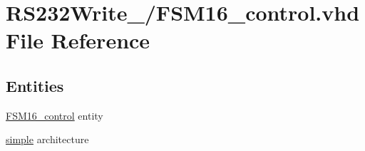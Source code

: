 \hypertarget{_f_s_m16__control_8vhd}{}\section{R\+S232\+Write\+\_/\+F\+S\+M16\+\_\+control.vhd File Reference}
\label{_f_s_m16__control_8vhd}
\subsection*{Entities}
\begin{DoxyCompactItemize}
\item 
\hyperlink{class_f_s_m16__control}{F\+S\+M16\+\_\+control} entity
\item 
\hyperlink{class_f_s_m16__control_1_1simple}{simple} architecture
\end{DoxyCompactItemize}
